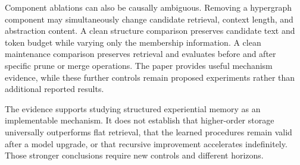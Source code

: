 Component ablations can also be causally ambiguous. Removing a hypergraph component may simultaneously change candidate retrieval, context length, and abstraction content. A clean structure comparison preserves candidate text and token budget while varying only the membership information. A clean maintenance comparison preserves retrieval and evaluates before and after specific prune or merge operations. The paper provides useful mechanism evidence, while these further controls remain proposed experiments rather than additional reported results.

The evidence supports studying structured experiential memory as an implementable mechanism. It does not establish that higher-order storage universally outperforms flat retrieval, that the learned procedures remain valid after a model upgrade, or that recursive improvement accelerates indefinitely. Those stronger conclusions require new controls and different horizons.

